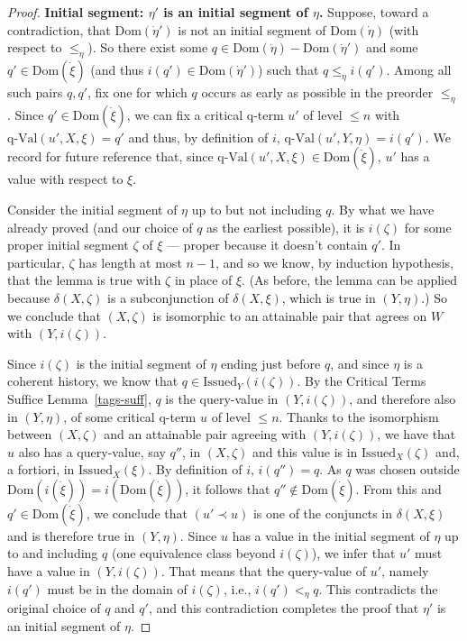 \documentclass{LMCS}
\theoremstyle{definition}
\newcommand{\Issued}{\text{Issued}}
\newcommand{\ans}{\dot}
\newcommand{\dom}[1]{\ensuremath{{\text{Dom}}(#1)}}
\newcommand{\qval}[3]{\ensuremath{\text{q-Val}(#1,#2,#3)}}
\begin{document}
\begin{proof}
\medskip\noindent\textbf{Initial segment: $\eta'$ is an initial
segment of $\eta$.}  Suppose, toward a contradiction, that
\dom{\ans\eta'} is not an initial segment of \dom{\ans\eta} (with
respect to $\leq_\eta$).  So there exist some
$q\in\dom{\ans\eta}-\dom{\ans\eta'}$ and some $q'\in\dom{\ans\xi}$
(and thus $i(q')\in\dom{\ans\eta'}$) such that $q\le_\eta i(q')$.
Among all such pairs $q,q'$, fix one for which $q$ occurs as early as
possible in the preorder $\le_\eta$.  Since $q'\in\dom{\ans\xi}$, we
can fix a critical q-term $u'$ of level $\leq n$ with
$\qval{u'}X\xi=q'$ and thus, by definition of $i$,
$\qval{u'}Y\eta=i(q')$.  We record for future reference that, since
$\qval{u'}X\xi\in\dom{\ans\xi}$, $u'$ has a value with respect to
$\xi$.

Consider the initial segment of $\eta$ up to but not including $q$. By
what we have already proved (and our choice of $q$ as the earliest
possible), it is $i(\zeta)$ for some proper initial segment $\zeta$ of
$\xi$ --- proper because it doesn't contain $q'$.  In particular,
$\zeta$ has length at most $n-1$, and so we know, by induction
hypothesis, that the lemma is true with $\zeta$ in place of $\xi$.
(As before, the lemma can be applied because $\delta(X,\zeta)$ is a
subconjunction of $\delta(X,\xi)$, which is true in $(Y,\eta)$.)  So
we conclude that $(X,\zeta)$ is isomorphic to an attainable pair that
agrees on $W$ with $(Y,i(\zeta))$.

Since $i(\zeta)$ is the initial segment of $\eta$ ending just before
$q$, and since $\eta$ is a coherent history, we know that
$q\in\Issued_Y(i(\zeta))$.  By the Critical Terms Suffice
Lemma~\ref{tags-suff}, $q$ is the query-value in $(Y,i(\zeta))$, and
therefore also in $(Y,\eta)$, of some critical q-term $u$ of level
$\le n$. Thanks to the isomorphism between $(X,\zeta)$ and an
attainable pair agreeing with $(Y,i(\zeta))$, we have that $u$ also
has a query-value, say $q''$, in $(X,\zeta)$ and this value is in
$\Issued_X(\zeta)$ and, a fortiori, in $\Issued_X(\xi)$.  By
definition of $i$, $i(q'')=q$. As $q$ was chosen outside
$\dom{i(\ans\xi)}=i(\dom{\ans\xi})$, it follows that
$q''\notin\dom{\ans\xi}$. From this and $q'\in\dom{\ans\xi}$, we
conclude that $(u'\prec u)$ is one of the conjuncts in $\delta(X,\xi)$
and is therefore true in $(Y,\eta)$. Since $u$ has a value in the
initial segment of $\eta$ up to and including $q$ (one equivalence
class beyond $i(\zeta)$), we infer that $u'$ must have a value in
$(Y,i(\zeta))$.  That means that the query-value of $u'$, namely
$i(q')$ must be in the domain of $i(\zeta)$, i.e., $i(q')<_\eta q$.
This contradicts the original choice of $q$ and $q'$, and this
contradiction completes the proof that $\eta'$ is an initial segment
of $\eta$.


\end{proof}
\end{document}
